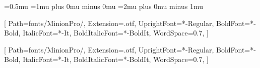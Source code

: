 \usepackage[no-math]{fontspec}
\usepackage{kpfonts}
\usepackage[T1]{fontenc}
\usepackage[english]{babel}
\usepackage[normalem]{ulem}
\usepackage[document]{ragged2e}

\usepackage[useregional=numeric]{datetime2}

\usepackage{ifthen}
\usepackage{calc}

\setlength\columnsep{7pt}%
\usepackage{setspace}
\thinmuskip=0.5mu                     %
\medmuskip=1mu plus 0mu minus 0mu   %
\thickmuskip=2mu plus 0mu minus 1mu %
\setlength\arraycolsep{1pt}

\usepackage{enumitem}

\usepackage{multicol, multirow, tabularx}
\usepackage{makecell}

\usepackage{graphicx}

\DeclareTextFontCommand{\emph}{\color{MediumOrchid}\bfseries\sffamily}




[%
    Path=fonts/MinionPro/,
    Extension=.otf,
    UprightFont=*-Regular,
    BoldFont=*-Bold,
    ItalicFont=*-It,
    BoldItalicFont=*-BoldIt,
    WordSpace=0.7,
]

\setmainfont{MinionPro}[%
    Path=fonts/MinionPro/,
    Extension=.otf,
    UprightFont=*-Regular,
    BoldFont=*-Bold,
    ItalicFont=*-It,
    BoldItalicFont=*-BoldIt,
    WordSpace=0.7,
]
\setsansfont[LetterSpace=-1.8,WordSpace=0.7,Scale=0.9]{Open Sans}




